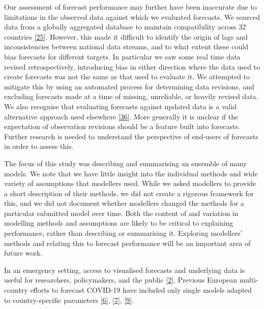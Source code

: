 \documentclass[
]{article}
\begin{document}
Our assessment of forecast performance may further have been inaccurate due to limitations in the observed data against which we evaluated forecasts. We sourced data from a globally aggregated database to maintain compatibility across 32 countries \protect\hyperlink{ref-dongInteractiveWebbasedDashboard2020}{{[}25{]}}. However, this made it difficult to identify the origin of lags and inconsistencies between national data streams, and to what extent these could bias forecasts for different targets. In particular we saw some real time data revised retrospectively, introducing bias in either direction where the data used to create forecasts was not the same as that used to evaluate it. We attempted to mitigate this by using an automated process for determining data revisions, and excluding forecasts made at a time of missing, unreliable, or heavily revised data. We also recognise that evaluating forecasts against updated data is a valid alternative approach used elsewhere \protect\hyperlink{ref-cramerEvaluationIndividualEnsemble2021}{{[}36{]}}. More generally it is unclear if the expectation of observation revisions should be a feature built into forecasts. Further research is needed to understand the perspective of end-users of forecasts in order to assess this.

The focus of this study was describing and summarising an ensemble of many models. We note that we have little insight into the individual methods and wide variety of assumptions that modellers used. While we asked modellers to provide a short description of their methods, we did not create a rigorous framework for this, and we did not document whether modellers changed the methods for a particular submitted model over time. Both the content of and variation in modelling methods and assumptions are likely to be critical to explaining performance, rather than describing or summarising it. Exploring modellers' methods and relating this to forecast performance will be an important area of future work.

In an emergency setting, access to visualised forecasts and underlying data is useful for researchers, policymakers, and the public \protect\hyperlink{ref-cdcCoronavirusDisease20192020}{{[}2{]}}. Previous European multi-country efforts to forecast COVID-19 have included only single models adapted to country-specific parameters \protect\hyperlink{ref-aguasModellingCOVID19Pandemic2020}{{[}6{]}}, \protect\hyperlink{ref-adibParticipatoryModellingApproach2021}{{[}7{]}}, \protect\hyperlink{ref-agostoMonitoringCOVID19Contagion2021}{{[}9{]}}.
\end{document}
